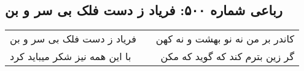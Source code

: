 \begin{center}
\section*{رباعی شماره ۵۰۰: فریاد ز دست فلک بی سر و بن}
\label{sec:sh500}
\begin{longtable}{l p{0.5cm} r}
فریاد ز دست فلک بی سر و بن
&&
کاندر بر من نه نو بهشت و نه کهن
\\
با این همه نیز شکر میباید کرد
&&
گر زین بترم کند که گوید که مکن
\\
\end{longtable}
\end{center}
